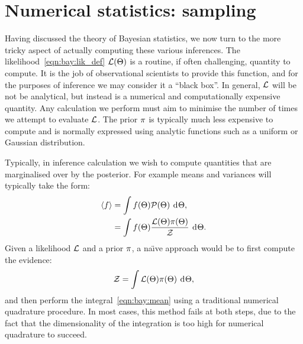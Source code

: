 \section{Numerical statistics: sampling}
\label{sec:bay:samp}
Having discussed the theory of Bayesian statistics, we now turn to the more tricky aspect of actually computing these various inferences. The likelihood~\eqref{eqn:bay:lik_def} $\mathcal{L}(\Theta)$ is a routine, if often challenging, quantity to compute. It is the job of observational scientists to provide this function, and for the purposes of inference we may consider it a ``black box''. In general, $\mathcal{L}$ will be not be analytical, but instead is a numerical and computationally expensive quantity. Any calculation we perform must aim to minimise the number of times we attempt to evaluate $\mathcal{L}$. The prior $\pi$ is typically much less expensive to compute and is normally expressed using analytic functions such as a uniform or Gaussian distribution.

Typically, in inference calculation we wish to compute quantities that are marginalised over by the posterior. For example means and variances will typically take the form:
\begin{align}
  {\left\langle{f}\right\rangle} 
  &= \int f(\Theta)\mathcal{P}(\Theta)\:\operatorname{d}^{}\!{\Theta},
  \label{eqn:bay:mean}\\
  &= \int f(\Theta)\frac{\mathcal{L}(\Theta)\pi(\Theta)}{\mathcal{Z}}\:\operatorname{d}^{}\!{\Theta}.
\end{align}
Given a likelihood $\mathcal{L}$ and a prior $\pi$, a na\"{\i}ve approach would be to first compute the evidence:
\begin{equation}
  \mathcal{Z} = \int \mathcal{L}(\Theta) \pi(\Theta) \: \operatorname{d}^{}\!{\Theta},
  \label{eqn:bay:ev_short}
\end{equation}
and then perform the integral~\eqref{eqn:bay:mean} using a traditional numerical quadrature procedure. In most cases, this method fails at both steps, due to the fact that the dimensionality of the integration is too high for numerical quadrature to succeed.

